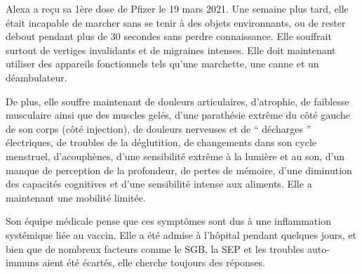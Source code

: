 Alexa a reçu sa 1ère dose de Pfizer le 19 mars 2021. Une semaine plus tard, elle
était incapable de marcher sans se tenir à des objets environnants, ou de rester
debout pendant plus de 30 secondes sans perdre connaissance. Elle souffrait
surtout de vertiges invalidants et de migraines intenses. Elle doit maintenant
utiliser des appareils fonctionnels tels qu'une marchette, une canne et un
déambulateur.

De plus, elle souffre maintenant de douleurs articulaires, d'atrophie, de
faiblesse musculaire ainsi que des muscles gelés, d'une parathésie extrême du
côté gauche de son corps (côté injection), de douleurs nerveuses et de “
décharges ” électriques, de troubles de la déglutition, de changements dans son
cycle menstruel, d'acouphènes, d'une sensibilité extrême à la lumière et au son,
d'un manque de perception de la profondeur, de pertes de mémoire, d'une
diminution des capacités cognitives et d'une sensibilité intense aux
aliments. Elle a maintenant une mobilité limitée.

Son équipe médicale pense que ces symptômes sont dus à une inflammation
systémique liée au vaccin. Elle a été admise à l'hôpital pendant quelques jours,
et bien que de nombreux facteurs comme le SGB, la SEP et les troubles
auto-immuns aient été écartés, elle cherche toujours des réponses.

